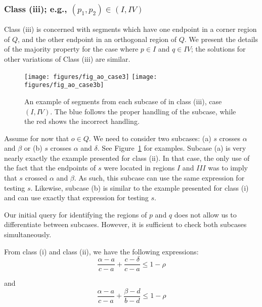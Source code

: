 \subsubsection*{Class (iii); e.g., $(p_1, p_2) \in (I, IV)$}
\label{:rectanges:ao:class3}

Class (iii) is concerned with segments which have one endpoint in a corner region of $Q$, and the other endpoint in an orthogonal region of $Q$. We present the details of the majority property for the case where $p \in I$ and $q \in IV$; the solutions for other variations of Class (iii) are similar.

\begin{figure}[t]
\begin{center}
  \texttt{[image: figures/fig\_ao\_case3]}
  \hspace{1.0em}
  \texttt{[image: figures/fig\_ao\_case3b]}
  \caption[An example of a segment in class (iii), case $(I, IV)$.]{An example of segments from each subcase of in class (iii), case $(I, IV)$. The blue follows the proper handling of the subcase, while the red shows the incorrect handling.}
  \label{fig:rectangles:ao:case3}
\end{center}
\end{figure}

Assume for now that $o \in Q$. We need to consider two subcases: (a) $s$ crosses $\alpha$ and $\beta$ or (b) $s$ crosses $\alpha$ and $\delta$. See Figure~\ref{fig:rectangles:ao:case3} for examples. Subcase (a) is very nearly exactly the example presented for class (ii). In that case, the only use of the fact that the endpoints of $s$ were located in regions $I$ and $III$ was to imply that $s$ crossed $\alpha$ and $\beta$. As such, this subcase can use the same expression for testing $s$. Likewise, subcase (b) is similar to the example presented for class (i) and can use exactly that expression for testing $s$.

Our initial query for identifying the regions of $p$ and $q$ does not allow us to differentiate between subcases. However, it is sufficient to check both subcases simultaneously.

From class (i) and class (ii), we have the following expressions:
\[ 
\frac{\alpha - a}{c - a} + \frac{c - \delta}{c - a} \leq 1 - \rho
\]

\noindent and
\[ 
\frac{\alpha - a}{c - a} + \frac{\beta - d}{b - d} \leq 1 - \rho
\]

